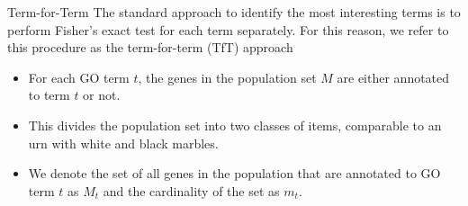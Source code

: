\documentclass{beamer}
\begin{document}
\begin{frame}{Term-for-Term}
 The standard approach to identify the most interesting terms is to
perform Fisher's exact test for each term separately. For this reason,
we refer to this procedure as the term-for-term (TfT)
approach

\begin{itemize}
 \item For each GO term $t$, the genes in the population set $M$ are either
annotated to term $t$ or not.
\item This divides the population set into two
classes of items, comparable to an urn with white and
black marbles. 
\item We denote the set of all genes in the population that
are annotated to GO term $t$ as  $M_t$ and the cardinality of the set
as $m_t$.
\end{itemize}

 
\end{frame}
\end{document}
